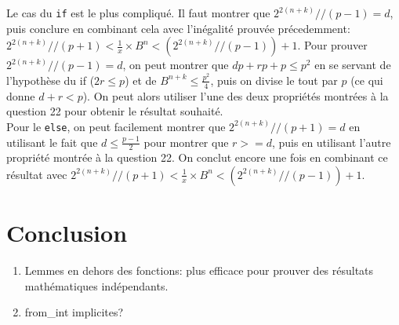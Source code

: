\documentclass[a4paper]{article}%
\begin{document}
	Le cas du \texttt{if} est le plus compliqué. Il faut montrer que $2^{2(n+k)} // (p-1) = d$,
	puis conclure en combinant cela avec l'inégalité prouvée précedemment: $2^{2(n+k)} // (p+1) < \frac{1}{x} \times B^n < (2^{2(n+k)} // (p-1)) + 1$.
	Pour prouver $2^{2(n+k)} // (p-1) = d$, on peut montrer que $dp + rp + p \leq p^2$ en se servant de l'hypothèse du if
	($ 2r \leq p $) et de $B^{n+k} \leq \frac{p^2}{4}$, puis on divise le tout par $p$ (ce qui donne $d + r < p$). On peut alors
	utiliser l'une des deux propriétés montrées à la question 22 pour obtenir le résultat souhaité.\\

	Pour le \texttt{else}, on peut facilement montrer que $2^{2(n+k)} // (p+1) = d$ en utilisant le fait que $d \leq \frac{p-1}{2}$
	pour montrer que $r >= d$, puis en utilisant l'autre propriété montrée à la question 22.
	On conclut encore une fois en combinant ce résultat avec $2^{2(n+k)} // (p+1) < \frac{1}{x} \times B^n < (2^{2(n+k)} // (p-1)) + 1$.


	\section{Conclusion}
		
	\begin{enumerate}
		\item Lemmes en dehors des fonctions: plus efficace pour prouver des résultats mathématiques indépendants.
		\item from\_int implicites?
	\end{enumerate}
\end{document}
